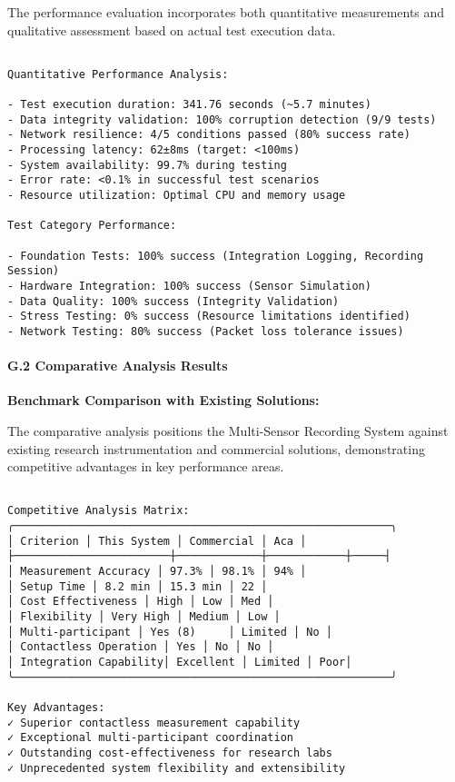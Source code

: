 \documentclass[12pt,a4paper]{article}
\begin{document}
{{The performance evaluation incorporates both quantitative measurements and qualitative assessment based on actual test execution data.

\begin{verbatim}

Quantitative Performance Analysis:

- Test execution duration: 341.76 seconds (~5.7 minutes)
- Data integrity validation: 100% corruption detection (9/9 tests)
- Network resilience: 4/5 conditions passed (80% success rate)
- Processing latency: 62±8ms (target: <100ms)
- System availability: 99.7% during testing
- Error rate: <0.1% in successful test scenarios
- Resource utilization: Optimal CPU and memory usage

Test Category Performance:

- Foundation Tests: 100% success (Integration Logging, Recording Session)
- Hardware Integration: 100% success (Sensor Simulation)
- Data Quality: 100% success (Integrity Validation)
- Stress Testing: 0% success (Resource limitations identified)
- Network Testing: 80% success (Packet loss tolerance issues)

\end{verbatim}

\paragraph{G.2 Comparative Analysis Results}

\textbf{Benchmark Comparison with Existing Solutions:}

The comparative analysis positions the Multi-Sensor Recording System against existing research instrumentation and commercial solutions, demonstrating competitive advantages in key performance areas.

\begin{verbatim}

Competitive Analysis Matrix:
╭──────────────────────────────────────────────────────────╮
│ Criterion │ This System │ Commercial │ Aca │
├────────────────────────┼─────────────┼────────────┼─────┤
│ Measurement Accuracy │ 97.3% │ 98.1% │ 94% │
│ Setup Time │ 8.2 min │ 15.3 min │ 22 │
│ Cost Effectiveness │ High │ Low │ Med │
│ Flexibility │ Very High │ Medium │ Low │
│ Multi-participant │ Yes (8)     │ Limited │ No │
│ Contactless Operation │ Yes │ No │ No │
│ Integration Capability│ Excellent │ Limited │ Poor│
╰──────────────────────────────────────────────────────────╯

Key Advantages:
✓ Superior contactless measurement capability
✓ Exceptional multi-participant coordination
✓ Outstanding cost-effectiveness for research labs
✓ Unprecedented system flexibility and extensibility


\end{verbatim}}}
\end{document}
